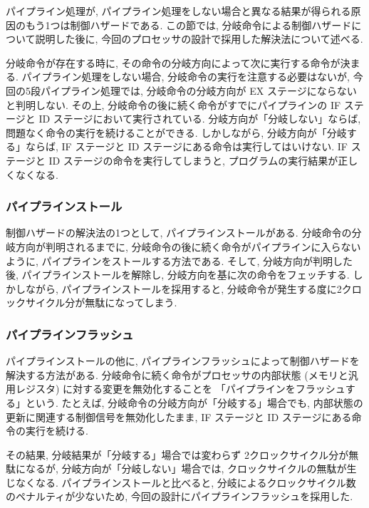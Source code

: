 \documentclass[../specifications.tex]{subfiles}
\begin{document}

  パイプライン処理が, 
  パイプライン処理をしない場合と異なる結果が得られる原因のもう1つは制御ハザードである.
  この節では, 分岐命令による制御ハザードについて説明した後に, 
  今回のプロセッサの設計で採用した解決法について述べる.

  分岐命令が存在する時に, その命令の分岐方向によって次に実行する命令が決まる.
  パイプライン処理をしない場合, 分岐命令の実行を注意する必要はないが, 
  今回の5段パイプライン処理では, 分岐命令の分岐方向が EX ステージにならないと判明しない.
  その上, 分岐命令の後に続く命令がすでにパイプラインの IF ステージと ID ステージにおいて実行されている.
  分岐方向が「分岐しない」ならば, 問題なく命令の実行を続けることができる.
  しかしながら, 分岐方向が「分岐する」ならば, IF ステージと ID ステージにある命令は実行してはいけない.
  IF ステージと ID ステージの命令を実行してしまうと, プログラムの実行結果が正しくなくなる.

  \subsubsection{パイプラインストール}
  制御ハザードの解決法の1つとして, パイプラインストールがある.
  分岐命令の分岐方向が判明されるまでに, 分岐命令の後に続く命令がパイプラインに入らないように, 
  パイプラインをストールする方法である.
  そして, 分岐方向が判明した後, パイプラインストールを解除し, 
  分岐方向を基に次の命令をフェッチする.
  しかしながら, パイプラインストールを採用すると, 
  分岐命令が発生する度に2クロックサイクル分が無駄になってしまう.

  \subsubsection{パイプラインフラッシュ}
  パイプラインストールの他に, パイプラインフラッシュによって制御ハザードを解決する方法がある.
  分岐命令に続く命令がプロセッサの内部状態 (メモリと汎用レジスタ) に対する変更を無効化することを
  「パイプラインをフラッシュする」という.
  たとえば, 分岐命令の分岐方向が「分岐する」場合でも, 
  内部状態の更新に関連する制御信号を無効化したまま, 
  IF ステージと ID ステージにある命令の実行を続ける.

  その結果, 分岐結果が「分岐する」場合では変わらず 2クロックサイクル分が無駄になるが, 
  分岐方向が「分岐しない」場合では, クロックサイクルの無駄が生じなくなる.
  パイプラインストールと比べると, 分岐によるクロックサイクル数のペナルティが少ないため, 
  今回の設計にパイプラインフラッシュを採用した.
\end{document}

